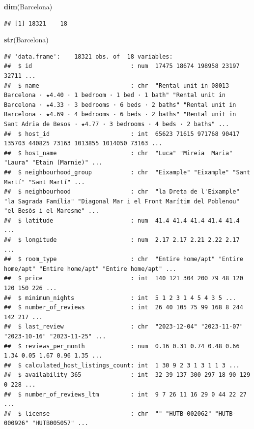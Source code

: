 \documentclass[
]{article}
\newenvironment{Shaded}{\begin{snugshade}}{\end{snugshade}}
\newcommand{\FunctionTok}[1]{\textcolor[rgb]{0.13,0.29,0.53}{\textbf{#1}}}
\newcommand{\NormalTok}[1]{#1}
\begin{document}
\begin{Shaded}
\begin{Highlighting}[]
\FunctionTok{dim}\NormalTok{(Barcelona)}
\end{Highlighting}
\end{Shaded}

\begin{verbatim}
## [1] 18321    18
\end{verbatim}

\begin{Shaded}
\begin{Highlighting}[]
\FunctionTok{str}\NormalTok{(Barcelona)}
\end{Highlighting}
\end{Shaded}

\begin{verbatim}
## 'data.frame':    18321 obs. of  18 variables:
##  $ id                            : num  17475 18674 198958 23197 32711 ...
##  $ name                          : chr  "Rental unit in 08013 Barcelona · ★4.40 · 1 bedroom · 1 bed · 1 bath" "Rental unit in Barcelona · ★4.33 · 3 bedrooms · 6 beds · 2 baths" "Rental unit in Barcelona · ★4.69 · 4 bedrooms · 6 beds · 2 baths" "Rental unit in Sant Adria de Besos · ★4.77 · 3 bedrooms · 4 beds · 2 baths" ...
##  $ host_id                       : int  65623 71615 971768 90417 135703 440825 73163 1013855 1014050 73163 ...
##  $ host_name                     : chr  "Luca" "Mireia  Maria" "Laura" "Etain (Marnie)" ...
##  $ neighbourhood_group           : chr  "Eixample" "Eixample" "Sant Martí" "Sant Martí" ...
##  $ neighbourhood                 : chr  "la Dreta de l'Eixample" "la Sagrada Família" "Diagonal Mar i el Front Marítim del Poblenou" "el Besòs i el Maresme" ...
##  $ latitude                      : num  41.4 41.4 41.4 41.4 41.4 ...
##  $ longitude                     : num  2.17 2.17 2.21 2.22 2.17 ...
##  $ room_type                     : chr  "Entire home/apt" "Entire home/apt" "Entire home/apt" "Entire home/apt" ...
##  $ price                         : int  140 121 304 200 79 48 120 120 150 226 ...
##  $ minimum_nights                : int  5 1 2 3 1 4 5 4 3 5 ...
##  $ number_of_reviews             : int  26 40 105 75 99 168 8 244 142 217 ...
##  $ last_review                   : chr  "2023-12-04" "2023-11-07" "2023-10-16" "2023-11-25" ...
##  $ reviews_per_month             : num  0.16 0.31 0.74 0.48 0.66 1.34 0.05 1.67 0.96 1.35 ...
##  $ calculated_host_listings_count: int  1 30 9 2 3 1 3 1 1 3 ...
##  $ availability_365              : int  32 39 137 300 297 18 90 129 0 228 ...
##  $ number_of_reviews_ltm         : int  9 7 26 11 16 29 0 44 22 27 ...
##  $ license                       : chr  "" "HUTB-002062" "HUTB-000926" "HUTB005057" ...
\end{verbatim}
\end{document}
